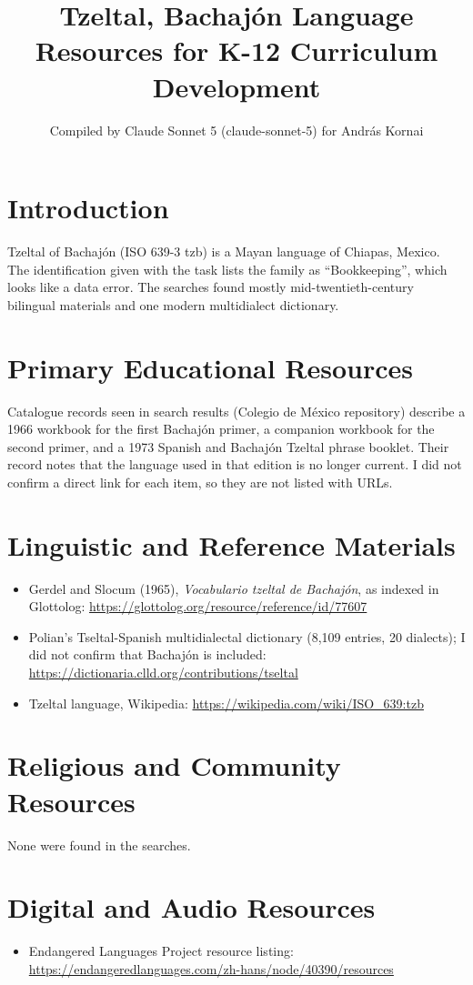 \documentclass[12pt]{article}
\title{Tzeltal, Bachaj\'on Language Resources for K-12 Curriculum Development}
\author{Compiled by Claude Sonnet 5 (claude-sonnet-5) for Andr\'as Kornai}
\date{}
\begin{document}
\maketitle

\section{Introduction}
Tzeltal of Bachaj\'on (ISO 639-3 tzb) is a Mayan language of Chiapas, Mexico. The identification given with the task lists the family as ``Bookkeeping'', which looks like a data error. The searches found mostly mid-twentieth-century bilingual materials and one modern multidialect dictionary.

\section{Primary Educational Resources}
Catalogue records seen in search results (Colegio de M\'exico repository) describe a 1966 workbook for the first Bachaj\'on primer, a companion workbook for the second primer, and a 1973 Spanish and Bachaj\'on Tzeltal phrase booklet. Their record notes that the language used in that edition is no longer current. I did not confirm a direct link for each item, so they are not listed with URLs.

\section{Linguistic and Reference Materials}
\begin{itemize}
\item Gerdel and Slocum (1965), \emph{Vocabulario tzeltal de Bachaj\'on}, as indexed in Glottolog: \url{https://glottolog.org/resource/reference/id/77607}
\item Polian's Tseltal-Spanish multidialectal dictionary (8,109 entries, 20 dialects); I did not confirm that Bachaj\'on is included: \url{https://dictionaria.clld.org/contributions/tseltal}
\item Tzeltal language, Wikipedia: \url{https://wikipedia.com/wiki/ISO_639:tzb}
\end{itemize}

\section{Religious and Community Resources}
None were found in the searches.

\section{Digital and Audio Resources}
\begin{itemize}
\item Endangered Languages Project resource listing: \url{https://endangeredlanguages.com/zh-hans/node/40390/resources}
\end{itemize}
\end{document}
